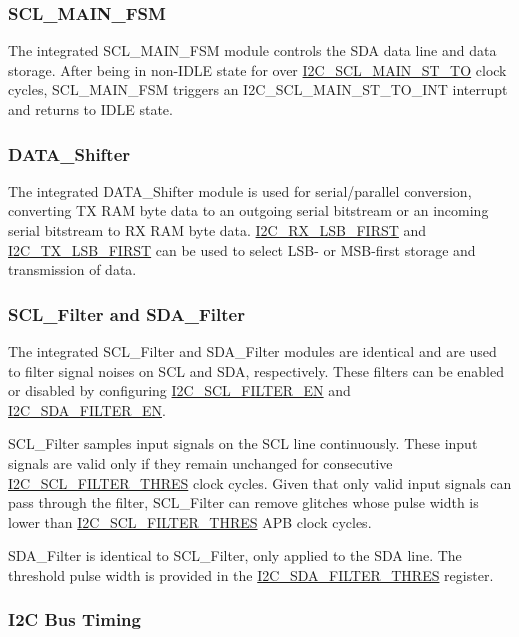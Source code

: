 \documentclass[main\_\_EN.tex]{subfiles}
\begin{document}
\subsubsection{SCL\_MAIN\_FSM}

The integrated SCL\_MAIN\_FSM module controls the SDA data line and data storage. After being in non-IDLE state for over \hyperref[fielddesc:I2CSCLMAINSTTO]{I2C\_SCL\_MAIN\_ST\_TO} clock cycles, SCL\_MAIN\_FSM triggers an I2C\_SCL\_MAIN\_ST\_TO\_INT interrupt and returns to IDLE state.

\subsubsection{DATA\_Shifter}

The integrated DATA\_Shifter module is used for serial/parallel conversion, converting TX RAM byte data to an outgoing serial bitstream or an incoming serial bitstream to RX RAM byte data. \hyperref[fielddesc:I2CRXLSBFIRST]{I2C\_RX\_LSB\_FIRST} and \hyperref[fielddesc:I2CTXLSBFIRST]{I2C\_TX\_LSB\_FIRST} can be used to select LSB- or MSB-first storage and transmission of data.

\subsubsection{SCL\_Filter and SDA\_Filter}

The integrated SCL\_Filter and SDA\_Filter modules are identical and are used to filter signal noises on SCL and SDA, respectively. These filters can be enabled or disabled by configuring \hyperref[fielddesc:I2CSCLFILTEREN]{I2C\_SCL\_FILTER\_EN} and \hyperref[fielddesc:I2CSDAFILTEREN]{I2C\_SDA\_FILTER\_EN}.

SCL\_Filter samples input signals on the SCL line continuously. These input signals are valid only if they remain unchanged for consecutive \hyperref[fielddesc:I2CSCLFILTERTHRES]{I2C\_SCL\_FILTER\_THRES} clock cycles. Given that only valid input signals can pass through the filter, SCL\_Filter can remove glitches whose pulse width is lower than \hyperref[fielddesc:I2CSCLFILTERTHRES]{I2C\_SCL\_FILTER\_THRES} APB clock cycles.

 SDA\_Filter is identical to SCL\_Filter, only applied to the SDA line. The threshold pulse width is provided in the \hyperref[fielddesc:I2CSDAFILTERTHRES]{I2C\_SDA\_FILTER\_THRES} register.

\subsubsection{I2C Bus Timing}
\end{document}
